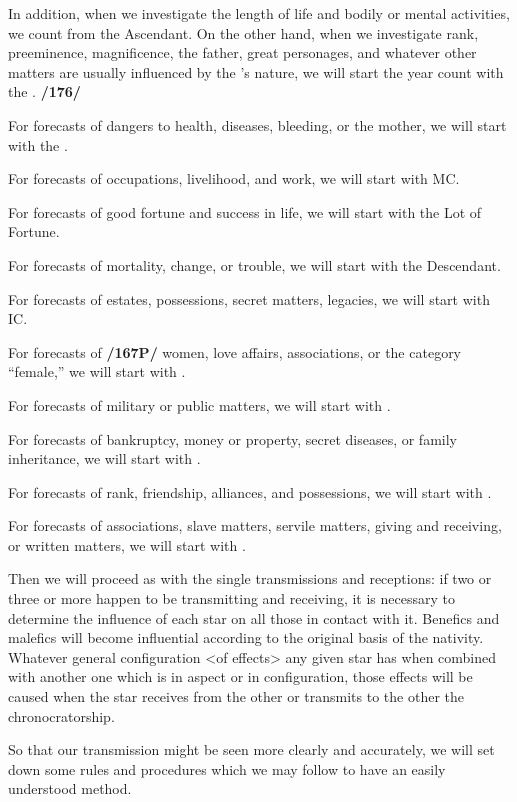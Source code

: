 In addition, when we investigate the length of life and bodily or mental activities, we count from the Ascendant. On the other hand, when we investigate rank, preeminence, magnificence, the father, great personages, and whatever other matters are usually influenced by the \Sun’s nature, we will start the year count with the \Sun. \textbf{/176/} 

For forecasts of dangers to health, diseases, bleeding, or the mother, we will start with the \Moon. 

For forecasts of occupations, livelihood, and work, we will start with MC. 

For forecasts of good fortune and success in life, we will start with the Lot of Fortune. 

For forecasts of mortality, change, or trouble, we will start with the Descendant. 

For forecasts of estates, possessions, secret matters, legacies, we will start with IC. 

For forecasts of \textbf{/167P/} women, love affairs, associations, or the category “female,” we will start with \Venus. 

For forecasts of military or public matters, we will start with \Mars.

For forecasts of bankruptcy, money or property, secret diseases, or family inheritance, we will start with
\Saturn. 

For forecasts of rank, friendship, alliances, and possessions, we will start with \Jupiter. 

For forecasts of associations, slave matters, servile matters, giving and receiving, or written matters, we will start with \Mercury.

Then we will proceed as with the single transmissions and receptions: if two or three or more happen to be transmitting and receiving, it is necessary to determine the influence of each star on all those in contact with it. Benefics and malefics will become influential according to the original basis of the nativity. Whatever general configuration <of effects> any given star has when combined with another one
which is in aspect or in configuration, those effects will be caused when the star receives from the other or transmits to the other the chronocratorship.

So that our transmission might be seen more clearly and accurately, we will set down some rules and procedures which we may follow to have an easily understood method. 

